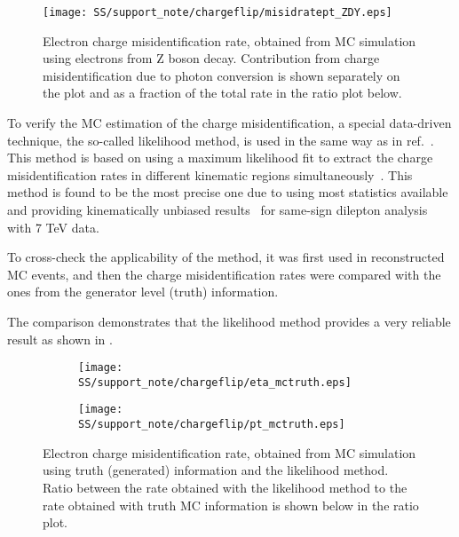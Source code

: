\begin{figure}
\begin{center}
 \texttt{[image: SS/support\_note/chargeflip/misidratept\_ZDY.eps]}
\caption{Electron charge misidentification rate, obtained from MC simulation using electrons from Z boson decay. 
Contribution from charge misidentification due to photon conversion is shown separately on the plot and as a fraction of the total rate in the ratio plot below.}
\label{fig:chargeFlip_structure}
\end{center}
\end{figure}

To verify the MC estimation of the charge misidentification, a special data-driven technique, the so-called likelihood method, 
is used in the same way as in ref.~\cite{same_sign_paper_7tev}.
This method is based on using a maximum likelihood fit to extract the charge misidentification rates in different kinematic regions simultaneously~\cite{cf_top_paper}.
This method is found to be the most precise one due to using most statistics available and providing kinematically unbiased results~\cite{anthony_thesis}
for same-sign dilepton analysis with 7 TeV data.

To cross-check the applicability of the method, it was first used 
in reconstructed MC events, and then the charge misidentification rates were compared with the ones from the generator level (truth) information. 

The comparison demonstrates that the likelihood method provides a very reliable result as shown in
.

\begin{figure}
\begin{subfigure}{.5\textwidth}
  \centering
  \texttt{[image: SS/support\_note/chargeflip/eta\_mctruth.eps]}
\end{subfigure}%
\begin{subfigure}{.5\textwidth}
  \centering
  \texttt{[image: SS/support\_note/chargeflip/pt\_mctruth.eps]}
\end{subfigure}
\caption{Electron charge misidentification rate, obtained from MC simulation using truth (generated) information and the likelihood method. 
Ratio between the rate obtained with the likelihood method to the rate obtained with truth MC information is shown below in the ratio plot. }
\label{fig:likelihood_cross_check}
\end{figure}


